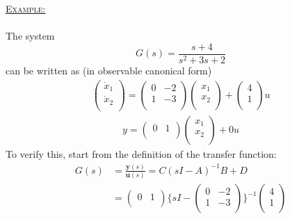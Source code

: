 \documentclass[12pt,a4paper]{article}
\begin{document}
\begin{itemize}
\begin{tcolorbox}[breakable] %
\underline{\textsc{Example:}}\\\\
The system 
\[G(s) = \frac{s+4}{s^{2}+3s+2}\]
can be written as  (in observable canonical form)
\begin{gather*}
\begin{pmatrix}
\dot{x}_{1}\\
\dot{x}_{2}\\
\end{pmatrix} = 
\begin{pmatrix}
0&-2\\
1&-3\\
\end{pmatrix}
\begin{pmatrix}
x_{1}\\
x_{2}\\
\end{pmatrix}
+
\begin{pmatrix}
4\\
1\\
\end{pmatrix}u
\end{gather*}
\begin{gather*}
y = 
\begin{pmatrix}
0&1\\
\end{pmatrix}
\begin{pmatrix}
x_{1}\\
x_{2}\\
\end{pmatrix}
+0u
\end{gather*}
To verify this, start from the definition of the transfer function:
\begin{equation*}
\begin{aligned}
G(s) &= \frac{\mathbf{y}(s)}{\mathbf{u}(s)} = C(sI-A)^{-1}B+D\\
&= \begin{pmatrix}
 0 & 1\\
\end{pmatrix}
\{sI-\begin{pmatrix}
0&-2\\
1&-3\\
\end{pmatrix}
\}^{-1}
\begin{pmatrix}
4\\
1\\
\end{pmatrix}\\

\end{aligned}
\end{equation*}
\end{tcolorbox}
\end{itemize}
\end{document}
